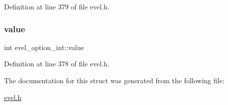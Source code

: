 Definition at line 379 of file evel.\+h.

\hypertarget{structevel__option__int_adca20c0088fc5dcda3172853985f77c6}{}\label{structevel__option__int_adca20c0088fc5dcda3172853985f77c6} 
\subsubsection{\texorpdfstring{value}{value}}
{\footnotesize\ttfamily int evel\+\_\+option\+\_\+int\+::value}



Definition at line 378 of file evel.\+h.



The documentation for this struct was generated from the following file\+:\begin{DoxyCompactItemize}
\item 
\hyperlink{evel_8h}{evel.\+h}\end{DoxyCompactItemize}
